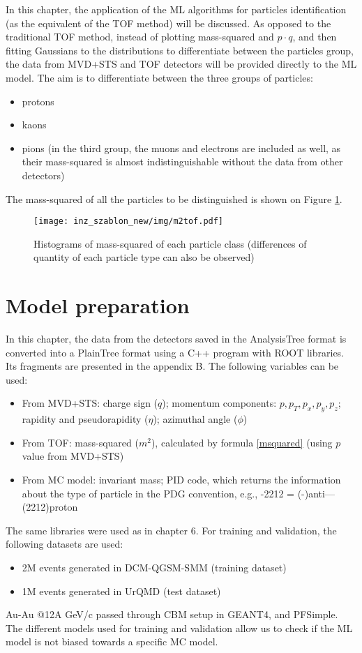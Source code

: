 \pagestyle{fancy}
In this chapter, the application of the ML algorithms for particles identification (as the equivalent of the TOF method) will be discussed. As opposed to the traditional TOF method, instead of plotting mass-squared and $p \cdot q$, and then fitting Gaussians to the distributions to differentiate between the particles group, the data from MVD+STS and TOF detectors will be provided directly to the ML model. The aim is to differentiate between the three groups of particles:
\begin{itemize}
    \item protons
    \item kaons
    \item pions (in the third group, the muons and electrons are included as well, as their mass-squared is almost indistinguishable without the data from other detectors)
\end{itemize}
The mass-squared of all the particles to be distinguished is shown on Figure \ref{mass-squared}.
\begin{figure}[h!]
    \centering
    \texttt{[image: inz\_szablon\_new/img/m2tof.pdf]}
    \caption{Histograms of mass-squared of each particle class (differences of quantity of each particle type can also be observed)}
    \label{mass-squared}
\end{figure}

\section{Model preparation}\thispagestyle{fancy}
In this chapter, the data from the detectors saved in the AnalysisTree format is converted into a PlainTree format using a C++ program with ROOT libraries. Its fragments are presented in the appendix B. The following variables can be used:
\begin{itemize}
    \item From MVD+STS: charge sign ($q$); momentum components: $p, p_T, p_x, p_y, p_z$; rapidity and pseudorapidity ($\eta$); azimuthal angle ($\phi$)
    \item From TOF: mass-squared ($m^2$), calculated by formula \ref{msquared} (using $p$ value from MVD+STS)
    \item From MC model: invariant mass; PID code, which returns the information about the type of particle in the PDG convention, e.g., -2212 = (-)anti—(2212)proton\cite{hepnames}
\end{itemize}
The same libraries were used as in chapter 6. For training and validation, the following datasets are used:
\begin{itemize}
    \item 2M events generated in DCM-QGSM-SMM (training dataset)
    \item 1M events generated in UrQMD (test dataset)
\end{itemize}
Au-Au @12A GeV/c passed through CBM setup in GEANT4, and PFSimple. The different models used for training and validation allow us to check if the ML model is not biased towards a specific MC model. 
